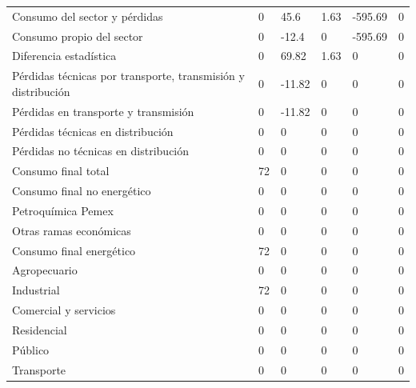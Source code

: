 \documentclass{sener2025}
\begin{document}
\begin{tabladoradoLargo}
\begin{xltabular}{\textwidth}{YZZZZZ}
    Consumo del sector y pérdidas & 0 & 45.6 & 1.63 & -595.69 & 0 \\
    \hspace{1.35em} Consumo propio del sector & 0 & -12.4 & 0 & -595.69 & 0 \\
    \hspace{1.35em} Diferencia estadística & 0 & 69.82 & 1.63 & 0 & 0 \\
    \hspace{1.35em} Pérdidas técnicas por transporte, transmisión y distribución & 0 & -11.82 & 0 & 0 & 0 \\
    \hspace{2.7em} Pérdidas en transporte y transmisión & 0 & -11.82 & 0 & 0 & 0 \\
    \hspace{2.7em} Pérdidas técnicas en distribución & 0 & 0 & 0 & 0 & 0 \\
    \hspace{2.7em} Pérdidas no técnicas  en distribución & 0 & 0 & 0 & 0 & 0 \\
    Consumo final total & 72 & 0 & 0 & 0 & 0 \\
    \hspace{1.35em} Consumo final no energético & 0 & 0 & 0 & 0 & 0 \\
    \hspace{2.7em} Petroquímica Pemex & 0 & 0 & 0 & 0 & 0 \\
    \hspace{2.7em} Otras ramas económicas & 0 & 0 & 0 & 0 & 0 \\
    Consumo final energético & 72 & 0 & 0 & 0 & 0 \\
    \hspace{2.7em} Agropecuario & 0 & 0 & 0 & 0 & 0 \\
    \hspace{2.7em} Industrial & 72 & 0 & 0 & 0 & 0 \\
    \hspace{2.7em} Comercial y servicios & 0 & 0 & 0 & 0 & 0 \\
    \hspace{2.7em} Residencial & 0 & 0 & 0 & 0 & 0 \\
    \hspace{2.7em} Público & 0 & 0 & 0 & 0 & 0 \\
    \hspace{2.7em} Transporte & 0 & 0 & 0 & 0 & 0 \\
  \end{xltabular}


\end{tabladoradoLargo}
\end{document}
